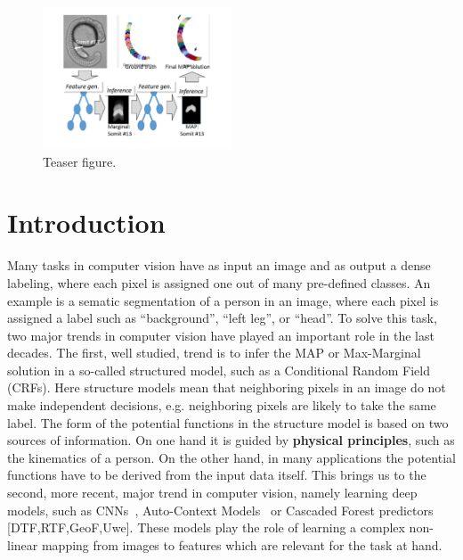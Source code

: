 \documentclass[10pt,twocolumn,letterpaper]{article}
\begin{document}
\begin{figure}
\includegraphics[width=0.5\textwidth]{Teaser.png}
\caption{Teaser figure.}
\label{fig:teaser.}
\end{figure}


\section{Introduction}
Many tasks in computer vision have as input an image and as output a dense labeling, where each pixel is assigned one out of many pre-defined classes. An example is a sematic segmentation of a person in an image, where each pixel is assigned a label such as “background”, “left leg”, or “head”. 
To solve this task, two major trends in computer vision have played an important role in the last decades.  The first, well studied, trend is to infer the MAP or Max-Marginal solution in a so-called structured model, such as a Conditional Random Field (CRFs). Here structure models mean that neighboring pixels in an image do not make independent decisions, e.g. neighboring pixels are likely to take the same label. The form of the potential functions in the structure model is based on two sources of information.  On one hand it is guided by {\bf physical principles}, such as the kinematics of a person. On the other hand, in many applications the potential functions have to be derived from the input data itself. This brings us to the second, more recent, major trend in computer vision, namely learning deep models, such as CNNs~\cite{NIPS2012_4824}, Auto-Context Models~\cite{AutoContext2008,PoseMachinesECCV2014} or Cascaded Forest predictors [DTF,RTF,GeoF,Uwe]. These models play the role of learning a complex non-linear mapping from images to features which are relevant for the task at hand. 
\end{document}
